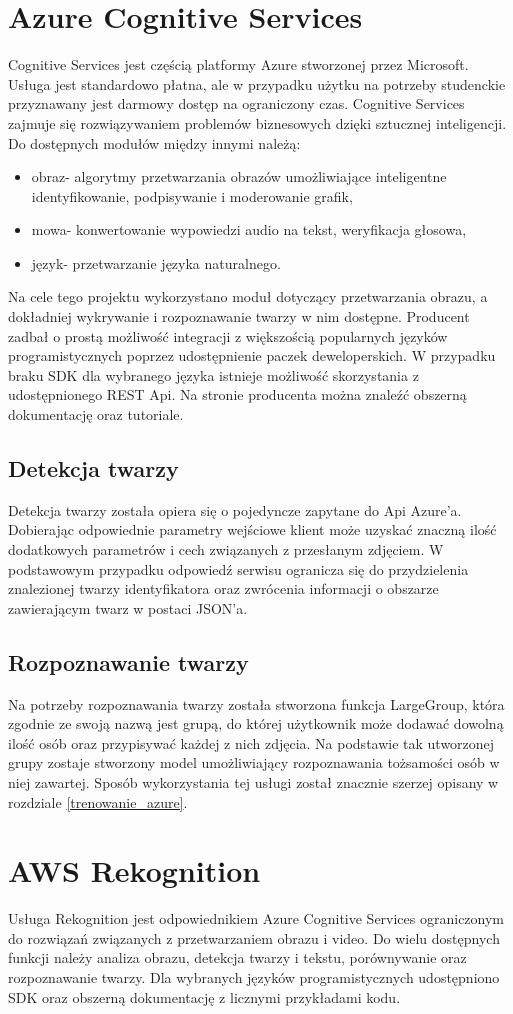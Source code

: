 \section{Azure Cognitive Services}\label{azurecs}
Cognitive Services jest częścią platformy Azure stworzonej przez Microsoft. Usługa jest standardowo płatna, ale w przypadku użytku na potrzeby studenckie przyznawany jest darmowy dostęp na ograniczony czas. Cognitive Services zajmuje się rozwiązywaniem problemów biznesowych dzięki sztucznej inteligencji. Do dostępnych modułów między innymi należą:
\begin{itemize}
\item obraz- algorytmy przetwarzania obrazów umożliwiające inteligentne identyfikowanie, podpisywanie i moderowanie grafik,
\item mowa- konwertowanie wypowiedzi audio na tekst, weryfikacja głosowa,
\item język- przetwarzanie języka naturalnego.
\end{itemize}
Na cele tego projektu wykorzystano moduł dotyczący przetwarzania obrazu, a dokładniej wykrywanie i rozpoznawanie twarzy w nim dostępne. Producent zadbał o prostą możliwość integracji z większością popularnych języków programistycznych poprzez udostępnienie paczek deweloperskich. W przypadku braku SDK dla wybranego języka istnieje możliwość skorzystania z udostępnionego REST Api. Na stronie producenta można znaleźć obszerną dokumentację oraz tutoriale.

\subsection{Detekcja twarzy}
Detekcja twarzy została opiera się o pojedyncze zapytane do Api Azure'a. Dobierając odpowiednie parametry wejściowe klient może uzyskać znaczną ilość dodatkowych parametrów i cech związanych z przesłanym zdjęciem. W podstawowym przypadku odpowiedź serwisu ogranicza się do przydzielenia znalezionej twarzy identyfikatora oraz zwrócenia informacji o obszarze zawierającym twarz w postaci JSON'a.

\subsection{Rozpoznawanie twarzy}
Na potrzeby rozpoznawania twarzy została stworzona funkcja LargeGroup, która zgodnie ze swoją nazwą jest grupą, do której użytkownik może dodawać dowolną ilość osób oraz przypisywać każdej z nich zdjęcia. Na podstawie tak utworzonej grupy zostaje stworzony model umożliwiający rozpoznawania tożsamości osób w niej zawartej. Sposób wykorzystania tej usługi został znacznie szerzej opisany w rozdziale \ref{trenowanie_azure}.

\section{AWS Rekognition}
Usługa Rekognition jest odpowiednikiem Azure Cognitive Services ograniczonym do rozwiązań związanych z przetwarzaniem obrazu i video. Do wielu dostępnych funkcji należy analiza obrazu, detekcja twarzy i tekstu, porównywanie oraz rozpoznawanie twarzy. Dla wybranych języków programistycznych udostępniono SDK oraz obszerną dokumentację z licznymi przykładami kodu.
